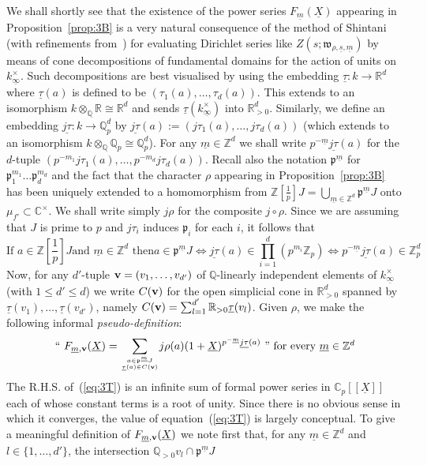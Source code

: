 \documentclass[12pt]{article}
\newcounter{rem}[section]%
\newcommand{\bbC}{\ensuremath{\mathbb{C}}}
\newcommand{\bbQ}{\ensuremath{\mathbb{Q}}}
\newcommand{\bbR}{\ensuremath{\mathbb{R}}}
\newcommand{\bbZ}{\ensuremath{\mathbb{Z}}}
\newcommand{\beql}[1]{\begin{equation}\label{#1}}
\newcommand{\bv}{\ensuremath{{\bf v}}}
\newcommand{\eeq}{\end{equation}}
\newcommand{\fp}{\ensuremath{\mathfrak{p}}}
\newcommand{\fw}{\ensuremath{\mathfrak{w}}}
\newcommand{\refeq}[1]{~(\ref{eq:#1})}
\newcommand{\rem}{\refstepcounter{rem}\noindent{\sc Remark \therem}}%
\renewcommand{\therem}{\thesection.\arabic{rem}}
\newcommand{\uinf}{\ensuremath{{\underline{\infty}}}}
\newcommand{\ujct}{\ensuremath{\underline{j\tau}}}
\newcommand{\um}{\ensuremath{{\underline{m}}}}
\newcommand{\us}{\ensuremath{{\underline{s}}}}
\newcommand{\utau}{\ensuremath{{\underline{\tau}}}}
\newcommand{\uX}{\ensuremath{{\underline{X}}}}
\begin{document}
We shall shortly see that the existence of the power series $F_{\um}(\uX)$ appearing in
Proposition~\ref{prop:3B} is a  very
natural consequence of the method of
Shintani~\cite{Shi} (with refinements from~\cite{Colm})
for evaluating Dirichlet series like $Z(s;\fw_{\rho,\us,\um})$ by means
of cone decompositions of fundamental domains
for the action of units on $k^\times_{\uinf}$.
Such decompositions are best visualised by using the embedding
$\utau: k\rightarrow \bbR^d$ where $\utau(a)$ is defined to be
$(\tau_1(a),\ldots,\tau_d(a))$. This
extends to an isomorphism $k\otimes_\bbQ \bbR\cong\bbR^d$ and
sends $\utau(k^\times_{\uinf})$ into $\bbR_{>0}^d$.
Similarly, we define an embedding $\ujct: k\rightarrow \bbQ_p^d$ by
$\ujct(a):=(j\tau_1(a),\ldots,j\tau_d(a))$
(which extends to an isomorphism $k\otimes_\bbQ\bbQ_p\cong \bbQ_p^d$).
For any $\um\in\bbZ^d$ we shall write $p^{-\um}\ujct(a)$ for the $d$-tuple
$(p^{-m_1}j\tau_1(a),\ldots,p^{-m_d}j\tau_d(a))$. Recall also the notation
$\fp^\um$ for $\fp_1^{m_1}\ldots\fp_d^{m_d}$
and the fact that the character $\rho$ appearing in Proposition~\ref{prop:3B} has been uniquely
extended to a homomorphism from
$\bbZ[{\textstyle\frac{1}{p}}]J=
\bigcup_{\um\in\bbZ^d}\fp^\um J$ onto $\mu_{f'}\subset\bbC^\times$.
We shall write simply $j\rho$ for the composite $j\circ\rho$.
Since we are assuming that
$J$ is prime to $p$ and $j\tau_i$ induces $\fp_i$ for each $i$,
it follows that
\beql{eq:3S.5}
\mbox{If $a\in\bbZ[{\textstyle\frac{1}{p}}]J$
and $\um\in\bbZ^d$ then
$a\in\fp^\um J\Leftrightarrow\ujct(a)\in
{\displaystyle \prod_{i=1}^d}\left(p^{m_i}\bbZ_p\right)
\Leftrightarrow p^{-\um}\ujct(a)\in \bbZ_p^d$
}
\eeq
Now, for any $d'$-tuple  $\bv=(v_1,\ldots,v_{d'})$ of $\bbQ$-linearly independent
elements of $k^\times_{\uinf}$ (with $1\leq d'\leq d$) we
write  $C(\bv)$ for the open simplicial cone in $\bbR_{>0}^d$ spanned by
$\utau(v_1),\ldots,\utau(v_{d'})$, namely $C(\bv)=\sum_{l=1}^{d'}\bbR_{>0}\utau(v_l)$.
Given $\rho$, we make the following informal \emph{pseudo-definition}:
\beql{eq:3T}
\mbox{``
$
F_{\um,\bv}(\uX)={\displaystyle \sum_{a\in \fp^{\um} J\atop \utau(a)\in C(\bv)}}
j\rho(a)
(1+\uX)^{p^{-\um}\ujct(a)}
$
'' for every $\um\in \bbZ^d$}
\eeq
The R.H.S. of\refeq{3T} is an infinite sum of formal power series in $\bbC_p[[\uX]]$
each of whose constant terms is a root of unity.
Since there is no obvious sense in which it converges,
the value of equation\refeq{3T} is largely conceptual.
To give a meaningful definition of $F_{\um,\bv}(\uX)$ we note first that,
for any $\um\in\bbZ^d$ and $l\in\{1,\ldots,d'\}$,
the intersection $\bbQ_{>0} v_l\cap\fp^\um J$
\end{document}

